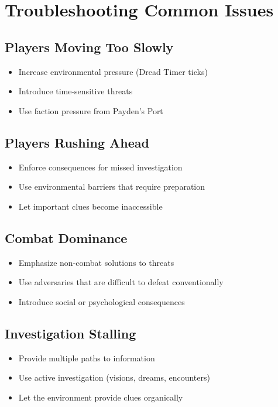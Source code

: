 \documentclass[11pt]{article}
\begin{document}
\section{Troubleshooting Common Issues}

\subsection{Players Moving Too Slowly}
\begin{itemize}
    \item Increase environmental pressure (Dread Timer ticks)
    \item Introduce time-sensitive threats
    \item Use faction pressure from Payden's Port
\end{itemize}

\subsection{Players Rushing Ahead}
\begin{itemize}
    \item Enforce consequences for missed investigation
    \item Use environmental barriers that require preparation
    \item Let important clues become inaccessible
\end{itemize}

\subsection{Combat Dominance}
\begin{itemize}
    \item Emphasize non-combat solutions to threats
    \item Use adversaries that are difficult to defeat conventionally
    \item Introduce social or psychological consequences
\end{itemize}

\subsection{Investigation Stalling}
\begin{itemize}
    \item Provide multiple paths to information
    \item Use active investigation (visions, dreams, encounters)
    \item Let the environment provide clues organically
\end{itemize}
\end{document}
